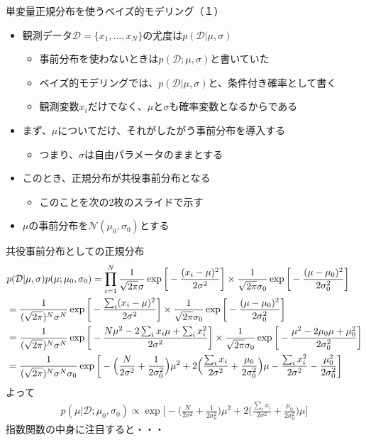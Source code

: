 \documentclass[aspectratio=169,unicode,dvipdfmx,14pt]{beamer}
\begin{document}
\begin{frame}{単変量正規分布を使うベイズ的モデリング（１）}
\begin{itemize}
\item 観測データ$\mathcal{D}=\{x_1,\ldots,x_N\}$の尤度は$p(\mathcal{D}|\mu,\sigma)$
\begin{itemize}
\item 事前分布を使わないときは$p(\mathcal{D};\mu,\sigma)$と書いていた
\item ベイズ的モデリングでは、$p(\mathcal{D}|\mu,\sigma)$と、条件付き確率として書く
\item 観測変数$x_i$だけでなく、$\mu$と$\sigma$も確率変数となるからである
\end{itemize}
\item まず、$\mu$についてだけ、それがしたがう事前分布を導入する
\begin{itemize}
\item つまり、$\sigma$は自由パラメータのままとする
\end{itemize}
\item このとき、正規分布が共役事前分布となる
\begin{itemize}
\item このことを次の2枚のスライドで示す
\end{itemize}
\item $\mu$の事前分布を$\mathcal{N}(\mu_0,\sigma_0)$とする
\end{itemize}
\end{frame}

\begin{frame}{共役事前分布としての正規分布}
\FontMath
\vspace{-.2in}
\begin{align}
& p(\mathcal{D}|\mu,\sigma)p(\mu;\mu_0,\sigma_0)
= \prod_{i=1}^N \frac{1}{\sqrt{2\pi}\sigma}\exp\bigg[ - \frac{  (x_i - \mu)^2 }{2\sigma^2} \bigg]
\times \frac{1}{\sqrt{2\pi}\sigma_0} \exp \bigg[ - \frac{  (\mu - \mu_0)^2  }{2\sigma_0^2} \bigg]
\notag \\ & =
\frac{1}{(\sqrt{2\pi})^N\sigma^N}\exp\bigg[ - \frac{  \sum_i (x_i - \mu)^2 }{2\sigma^2} \bigg]
\times \frac{1}{\sqrt{2\pi}\sigma_0} \exp \bigg[ - \frac{  (\mu - \mu_0)^2  }{2\sigma_0^2} \bigg]
\notag \\ & =
\frac{1}{(\sqrt{2\pi})^N\sigma^N}\exp\bigg[ - \frac{  N\mu^2 - 2\sum_i x_i \mu + \sum_i x_i^2 }{2\sigma^2} \bigg]
\times \frac{1}{\sqrt{2\pi}\sigma_0} \exp \bigg[ - \frac{  \mu^2 - 2\mu_0\mu + \mu_0^2  }{2\sigma_0^2} \bigg]
\notag \\ & =
\frac{1}{(\sqrt{2\pi})^N\sigma^N\sigma_0}
\exp\bigg[ 
- \Big( \frac{N}{2\sigma^2} + \frac{1}{2\sigma_0^2} \Big) \mu^2 
+ 2 \Big( \frac{ \sum_i x_i}{2\sigma^2} + \frac{\mu_0}{2\sigma_0^2} \Big) \mu 
- \frac{ \sum_i x_i^2}{2\sigma^2} - \frac{\mu_0^2}{2\sigma_0^2} \bigg]
\end{align}
よって
\begin{align}
p(\mu | \mathcal{D}; \mu_0, \sigma_0)
\propto
\exp\bigg[ 
- \Big( \frac{N}{2\sigma^2} + \frac{1}{2\sigma_0^2} \Big) \mu^2 
+ 2 \Big( \frac{ \sum_i x_i}{2\sigma^2} + \frac{\mu_0}{2\sigma_0^2} \Big) \mu \bigg]
\end{align}
指数関数の中身に注目すると・・・
\end{frame}
\end{document}
